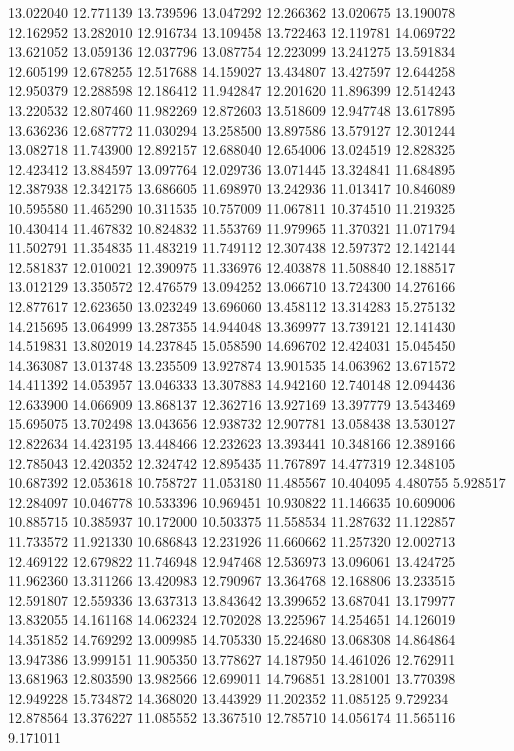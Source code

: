 13.022040
12.771139
13.739596
13.047292
12.266362
13.020675
13.190078
12.162952
13.282010
12.916734
13.109458
13.722463
12.119781
14.069722
13.621052
13.059136
12.037796
13.087754
12.223099
13.241275
13.591834
12.605199
12.678255
12.517688
14.159027
13.434807
13.427597
12.644258
12.950379
12.288598
12.186412
11.942847
12.201620
11.896399
12.514243
13.220532
12.807460
11.982269
12.872603
13.518609
12.947748
13.617895
13.636236
12.687772
11.030294
13.258500
13.897586
13.579127
12.301244
13.082718
11.743900
12.892157
12.688040
12.654006
13.024519
12.828325
12.423412
13.884597
13.097764
12.029736
13.071445
13.324841
11.684895
12.387938
12.342175
13.686605
11.698970
13.242936
11.013417
10.846089
10.595580
11.465290
10.311535
10.757009
11.067811
10.374510
11.219325
10.430414
11.467832
10.824832
11.553769
11.979965
11.370321
11.071794
11.502791
11.354835
11.483219
11.749112
12.307438
12.597372
12.142144
12.581837
12.010021
12.390975
11.336976
12.403878
11.508840
12.188517
13.012129
13.350572
12.476579
13.094252
13.066710
13.724300
14.276166
12.877617
12.623650
13.023249
13.696060
13.458112
13.314283
15.275132
14.215695
13.064999
13.287355
14.944048
13.369977
13.739121
12.141430
14.519831
13.802019
14.237845
15.058590
14.696702
12.424031
15.045450
14.363087
13.013748
13.235509
13.927874
13.901535
14.063962
13.671572
14.411392
14.053957
13.046333
13.307883
14.942160
12.740148
12.094436
12.633900
14.066909
13.868137
12.362716
13.927169
13.397779
13.543469
15.695075
13.702498
13.043656
12.938732
12.907781
13.058438
13.530127
12.822634
14.423195
13.448466
12.232623
13.393441
10.348166
12.389166
12.785043
12.420352
12.324742
12.895435
11.767897
14.477319
12.348105
10.687392
12.053618
10.758727
11.053180
11.485567
10.404095
4.480755
5.928517
12.284097
10.046778
10.533396
10.969451
10.930822
11.146635
10.609006
10.885715
10.385937
10.172000
10.503375
11.558534
11.287632
11.122857
11.733572
11.921330
10.686843
12.231926
11.660662
11.257320
12.002713
12.469122
12.679822
11.746948
12.947468
12.536973
13.096061
13.424725
11.962360
13.311266
13.420983
12.790967
13.364768
12.168806
13.233515
12.591807
12.559336
13.637313
13.843642
13.399652
13.687041
13.179977
13.832055
14.161168
14.062324
12.702028
13.225967
14.254651
14.126019
14.351852
14.769292
13.009985
14.705330
15.224680
13.068308
14.864864
13.947386
13.999151
11.905350
13.778627
14.187950
14.461026
12.762911
13.681963
12.803590
13.982566
12.699011
14.796851
13.281001
13.770398
12.949228
15.734872
14.368020
13.443929
11.202352
11.085125
9.729234
12.878564
13.376227
11.085552
13.367510
12.785710
14.056174
11.565116
9.171011
